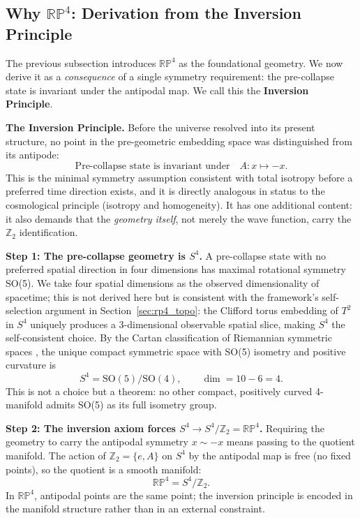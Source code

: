 \documentclass[12pt,a4paper]{article}
\begin{document}
\subsection{Why $\mathbb{RP}^4$: Derivation from the Inversion Principle}
\label{sec:rp4_derivation}

The previous subsection introduces $\mathbb{RP}^4$ as the foundational geometry.
We now derive it as a \emph{consequence} of a single symmetry requirement: the
pre-collapse state is invariant under the antipodal map. We call this the
\textbf{Inversion Principle}.

\textbf{The Inversion Principle.} Before the universe resolved into its present
structure, no point in the pre-geometric embedding space was distinguished from
its antipode:
\begin{equation}
  \text{Pre-collapse state is invariant under}\quad A: x \mapsto -x.
  \label{eq:inversion_principle}
\end{equation}
This is the minimal symmetry assumption consistent with total isotropy before
a preferred time direction exists, and it is directly analogous in status to
the cosmological principle (isotropy and homogeneity). It has one additional
content: it also demands that the \emph{geometry itself}, not merely the wave
function, carry the $\mathbb{Z}_2$ identification.

\textbf{Step 1: The pre-collapse geometry is $S^4$.}
A pre-collapse state with no preferred spatial direction in four dimensions
has maximal rotational symmetry SO(5). We take four spatial dimensions as the
observed dimensionality of spacetime; this is not derived here but is consistent
with the framework's self-selection argument in Section~\ref{sec:rp4_topo}: the
Clifford torus embedding of $T^2$ in $S^4$ uniquely produces a 3-dimensional
observable spatial slice, making $S^4$ the self-consistent choice. By the Cartan
classification of Riemannian symmetric spaces \cite{Helgason1978}, the unique
compact symmetric space with SO(5) isometry and positive curvature is
\begin{equation}
  S^4 = \mathrm{SO}(5)/\mathrm{SO}(4), \qquad \dim = 10 - 6 = 4.
  \label{eq:s4_unique}
\end{equation}
This is not a choice but a theorem: no other compact, positively curved 4-manifold
admits SO(5) as its full isometry group.

\textbf{Step 2: The inversion axiom forces $S^4 \to S^4/\mathbb{Z}_2 = \mathbb{RP}^4$.}
Requiring the geometry to carry the antipodal symmetry $x \sim -x$ means
passing to the quotient manifold. The action of $\mathbb{Z}_2 = \{e, A\}$
on $S^4$ by the antipodal map is free (no fixed points), so the quotient
is a smooth manifold:
\begin{equation}
  \mathbb{RP}^4 = S^4 / \mathbb{Z}_2.
  \label{eq:rp4_quotient}
\end{equation}
In $\mathbb{RP}^4$, antipodal points are the same point; the inversion principle
is encoded in the manifold structure rather than in an external constraint.
\end{document}

